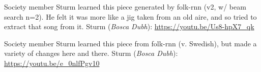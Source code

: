 \documentclass[a4paper,notitlepage,twoside]{book}
\begin{document}
{}  
\hypertarget{piece:Theyareeverywhere}{}
Society member Sturm learned this piece 
generated by folk-rnn (v2, w/ beam search n=2).
He felt it was more like a jig taken from an old aire,
and so tried to extract that song from it.
Sturm ({\em Bosca Dubh}): \url{https://youtu.be/Us8-hpX7_qk}

{}  
\hypertarget{piece:SlowWaltz}{}
Society member Sturm learned this piece from folk-rnn (v. Swedish),
but made a variety of changes here and there.
Sturm ({\em Bosca Dubh}): \url{https://youtu.be/e_0nlfPgv10}



%
%


\clearpage
\printindex

\backmatter 

\end{document}
